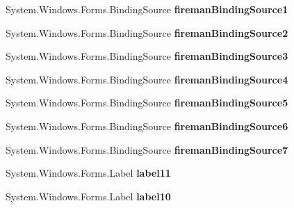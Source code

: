 \begin{DoxyCompactItemize}
System.\+Windows.\+Forms.\+Binding\+Source {\bfseries fireman\+Binding\+Source1}
\item 
\mbox{\label{class_statystyki___o_s_p_1_1_accident_form_ace6cc26c5b7840f252a47586bf71f244}} 
System.\+Windows.\+Forms.\+Binding\+Source {\bfseries fireman\+Binding\+Source2}
\item 
\mbox{\label{class_statystyki___o_s_p_1_1_accident_form_ad63d9533bb3b7be8ab41baf5f5d84181}} 
System.\+Windows.\+Forms.\+Binding\+Source {\bfseries fireman\+Binding\+Source3}
\item 
\mbox{\label{class_statystyki___o_s_p_1_1_accident_form_a6163dfff64f12755d790b5b3d998c26b}} 
System.\+Windows.\+Forms.\+Binding\+Source {\bfseries fireman\+Binding\+Source4}
\item 
\mbox{\label{class_statystyki___o_s_p_1_1_accident_form_a67e5c22a35f0274eab634bf56bd2a01e}} 
System.\+Windows.\+Forms.\+Binding\+Source {\bfseries fireman\+Binding\+Source5}
\item 
\mbox{\label{class_statystyki___o_s_p_1_1_accident_form_aae63b51ea0a55799236eb09e072b491f}} 
System.\+Windows.\+Forms.\+Binding\+Source {\bfseries fireman\+Binding\+Source6}
\item 
\mbox{\label{class_statystyki___o_s_p_1_1_accident_form_af5630a9fa6730eca2d22a8db71423bb5}} 
System.\+Windows.\+Forms.\+Binding\+Source {\bfseries fireman\+Binding\+Source7}
\item 
\mbox{\label{class_statystyki___o_s_p_1_1_accident_form_a0de4127a22f9cb435f4cf8b44a2f127b}} 
System.\+Windows.\+Forms.\+Label {\bfseries label11}
\item 
\mbox{\label{class_statystyki___o_s_p_1_1_accident_form_ae9fcbd6e1850a712afd3819a16616341}} 
System.\+Windows.\+Forms.\+Label {\bfseries label10}
\item 
\mbox{\label{class_statystyki___o_s_p_1_1_accident_form_af89e2f7c6c3e91903809d18b28075363}} 

\end{DoxyCompactItemize}
